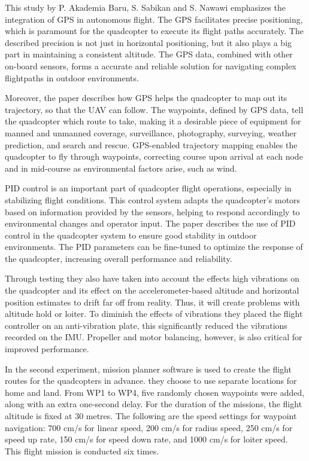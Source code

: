 \documentclass{report}
\begin{document}
This study \cite{AkademiaBaru2016}  by P. Akademia Baru, S. Sabikan and S. Nawawi emphasizes the integration of GPS in
autonomous flight. The GPS facilitates precise positioning, which is paramount
for the quadcopter to execute its flight paths accurately. The described
precision is not just in horizontal positioning, but it also plays a big part in
maintaining a consistent altitude. The GPS data, combined with other on-board
sensors, forms a accurate and reliable solution for navigating complex
flightpaths in outdoor environments.

Moreover, the paper describes how GPS helps the quadcopter to map out its
trajectory, so that the UAV can follow. The waypoints, defined by GPS data, tell
the quadcopter which route to take, making it a desirable piece of equipment for
manned and unmanned coverage, surveillance, photography, surveying, weather
prediction, and search and rescue. GPS-enabled trajectory mapping enables the
quadcopter to fly through waypoints, correcting course upon arrival at each node
and in mid-course as environmental factors arise, such as wind.

PID control is an important part of quadcopter flight operations, especially in
stabilizing flight conditions. This control system adapts the quadcopter's
motors based on information provided by the sensors, helping to respond
accordingly to environmental changes and operator input. The paper describes the
use of PID control in the quadcopter system to ensure good stability in outdoor
environments. The PID parameters can be fine-tuned to optimize the response of
the quadcopter, increasing overall performance and reliability.

Through testing they also have taken into account the effects high vibrations on
the quadcopter and its effect on the accelerometer-based altitude and horizontal
position estimates to drift far off from reality. Thus, it will create problems
with altitude hold or loiter. To diminish the effects of vibrations they placed
the flight controller on an anti-vibration plate, this significantly reduced the
vibrations recorded on the IMU. Propeller and motor balancing, however, is also
critical for improved performance.

In the second experiment, mission planner software is used to create the flight
routes for the quadcopters in advance. they choose to use separate locations for
home and land. From WP1 to WP4, five randomly chosen waypoints were added, along
with an extra one-second delay. For the duration of the missions, the flight
altitude is fixed at 30 metres. The following are the speed settings for
waypoint navigation: 700 cm/s for linear speed, 200 cm/s for radius speed, 250
cm/s for speed up rate, 150 cm/s for speed down rate, and 1000 cm/s for loiter
speed. This flight mission is conducted six times.
\end{document}
